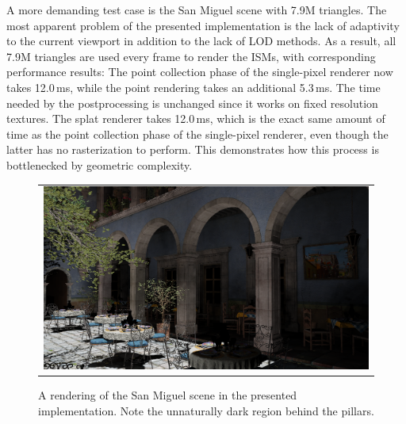 A more demanding test case is the San Miguel scene with 7.9M triangles. The most apparent problem of the presented implementation is the lack of adaptivity to the current viewport in addition to the lack of LOD methods. As a result, all 7.9M triangles are used every frame to render the ISMs, with corresponding performance results: The point collection phase of the single-pixel renderer now takes 12.0\,ms, while the point rendering takes an additional 5.3\,ms. The time needed by the postprocessing is unchanged since it works on fixed resolution textures. The splat renderer takes 12.0\,ms, which is the exact same amount of time as the point collection phase of the single-pixel renderer, even though the latter has no rasterization to perform. This demonstrates how this process is bottlenecked by geometric complexity.


\begin{figure}[htb]
\centering
  \begin{tabular}{@{}c@{}}
    \includegraphics[width=1.0\textwidth]{screenshots/san_miguel_wide} \\
  \end{tabular}
  \caption{A rendering of the San Miguel scene in the presented implementation. Note the unnaturally dark region behind the pillars.}
  \label{fig:results:san_miguel_wide}
\end{figure}

